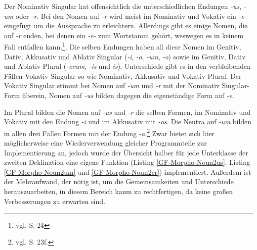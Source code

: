 Der Nominativ Singular hat offensichtlich die unterschiedlichen Endungen \textit{-us}, \textit{-um} oder \textit{-r}. Bei den Nomen auf \textit{-r} wird meist im Nominativ und Vokativ ein \textit{-e-} eingefügt um die Aussprache zu erleichtern. Allerdings gibt es einige Nomen, die auf \textit{-r} enden, bei denen ein \textit{-e-} zum Wortstamm gehört, weswegen es in keinem Fall entfallen kann.\footnote{vgl. \cite{BAYER-LINDAUER1994} S. 24}. Die selben Endungen haben all diese Nomen im Genitiv, Dativ, Akkusativ und Ablativ Singular (\textit{-i}, \textit{-o}, \textit{-um}, \textit{-o}) sowie im Genitiv, Dativ und Ablativ Plural (\textit{-orum}, \textit{-is} und \textit{is}). Unterschiede gibt es in den verbleibenden Fällen Vokativ Singular so wie Nominativ, Akkusativ und Vokativ Plural. Der Vokativ Singular stimmt bei Nomen auf \textit{-um} und \textit{-r} mit der Nominativ Singular-Form überein, Nomen auf \textit{-us} bilden dagegen die eigenständige Form auf \textit{-e}. \par
Im Plural bilden die Nomen auf \textit{-us} und \textit{-r} die selben Formen, im Nominativ und Vokativ mit den Endung \textit{-i} und im Akkusativ mit \textit{-os}. Die Neutra auf \textit{-um} bilden in allen drei Fällen Formen mit der Endung \textit{-a}.\footnote{vgl. \cite{BAYER-LINDAUER1994} S. 23f.} Zwar bietet sich hier möglicherweise eine Wiederverwendung gleicher Programmteile zur Implementierung an, jedoch wurde der Übersicht halber für jede Unterklasse der zweiten Deklination eine eigene Funktion (Listing \ref{GF-Morpho-Noun2us}, Listing \ref{GF-Morpho-Noun2um} und \ref{GF-Morpho-Noun2er}) implementiert. Außerdem ist der Mehraufwand, der nötig ist, um die Gemeinsamkeiten und Unterschiede herauszuarbeiten, in diesem Bereich kaum zu rechtfertigen, da keine großen Verbesserungen zu erwarten sind. \par
\FloatBarrier
